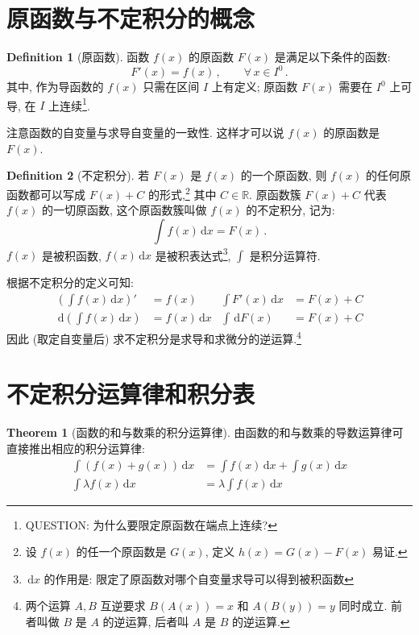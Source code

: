 \documentclass{book}
\newcommand{\Any}{\forall\,}
\newcommand{\dd}{\,\mathrm{d}}
\newcommand{\R}{\mathbb{R}}
\numberwithin{equation}{section}
\numberwithin{figure}{section}
\theoremstyle{definition}
\newtheorem{definition}{Definition}
\newtheorem{theorem}{Theorem}[section]
\begin{document}
\section{原函数与不定积分的概念}
\begin{definition}[原函数]
  函数 $f(x)$ 的原函数 $F(x)$ 是满足以下条件的函数:
  \begin{equation*}
    F'(x)=f(x)\,,\qquad\Any x\in I^0\,.
  \end{equation*}
  其中, 作为导函数的 $f(x)$ 只需在区间 $I$ 上有定义; 原函数 $F(x)$ 需要在 $I^0$ 上可导, 在 $I$ 上连续\footnote{QUESTION: 为什么要限定原函数在端点上连续?}.
\end{definition}
注意函数的自变量与求导自变量的一致性. 这样才可以说 $f(x)$ 的原函数是 $F(x)$.

\begin{definition}[不定积分]
  若 $F(x)$ 是 $f(x)$ 的一个原函数, 则 $f(x)$ 的任何原函数都可以写成 $F(x)+C$ 的形式,\footnote{设 $f(x)$ 的任一个原函数是 $G(x)$, 定义 $h(x)=G(x)-F(x)$ 易证.} 其中 $C\in\R$. 原函数簇 $F(x)+C$ 代表 $f(x)$ 的一切原函数, 这个原函数簇叫做 $f(x)$ 的不定积分, 记为:
  \begin{equation*}
    \int f(x)\dd x=F(x)\,.
  \end{equation*}
  $f(x)$ 是被积函数, $f(x)\dd x$ 是被积表达式\footnote{$\dd x$ 的作用是: 限定了原函数对哪个自变量求导可以得到被积函数}, $\int$ 是积分运算符.
\end{definition}

根据不定积分的定义可知:
\begin{align*}
  \left( \int f(x)\dd x \right)'&=f(x)&\int F'(x)\dd x&=F(x)+C\\
  \dd\left( \int f(x)\dd x \right)&=f(x)\dd x&\int\dd F(x)&=F(x)+C
\end{align*}
因此 (取定自变量后) 求不定积分是求导和求微分的逆运算.\footnote{两个运算 $A,B$ 互逆要求 $B(A(x))=x$ 和 $A(B(y))=y$ 同时成立. 前者叫做 $B$ 是 $A$ 的逆运算, 后者叫 $A$ 是 $B$ 的逆运算.}

\section{不定积分运算律和积分表}
\begin{theorem}[函数的和与数乘的积分运算律]
  由函数的和与数乘的导数运算律可直接推出相应的积分运算律:
  \begin{align*}
    \int(f(x)+g(x))\dd x&=\int f(x)\dd x+\int g(x)\dd x\\
    \int\lambda f(x)\dd x&=\lambda\int f(x)\dd x
  \end{align*}
\end{theorem}
\end{document}
